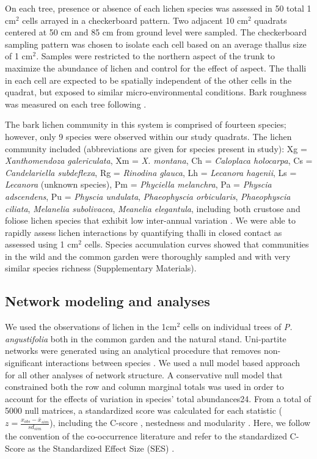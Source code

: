 \documentclass[fleqn,10pt]{wlscirep}
\begin{document}
On each tree, presence or absence of each lichen species was assessed
in 50 total 1 cm$^2$ cells arrayed in a checkerboard pattern. Two
adjacent 10 cm$^2$ quadrats centered at 50 cm and 85 cm from ground
level were sampled. The checkerboard sampling pattern was chosen to
isolate each cell based on an average thallus size of 1
cm$^2$. Samples were restricted to the northern aspect of the trunk to
maximize the abundance of lichen and control for the effect of
aspect. The thalli in each cell are expected to be spatially
independent of the other cells in the quadrat, but exposed to similar
micro-environmental conditions. Bark roughness was measured on each
tree following \cite{Winfree2011}.

The bark lichen community in this system is comprised of fourteen
species; however, only 9 species were observed within our study
quadrats. The lichen community included (abbreviations are given for
species present in study): Xg = \textit{Xanthomendoza galericulata},
Xm = \textit{X. montana}, Ch = \textit{Caloplaca holocarpa}, Cs =
\textit{Candelariella subdeflexa}, Rg = \textit{Rinodina glauca}, Lh =
\textit{Lecanora hagenii}, Ls = \textit{Lecanora} (unknown species),
Pm = \textit{Phyciella melanchra}, Pa = \textit{Physcia adscendens},
Pu = \textit{Physcia undulata}, \textit{Phaeophyscia orbicularis},
\textit{Phaeophyscia ciliata}, \textit{Melanelia subolivacea},
\textit{Meanelia elegantula}, including both crustose and foliose
lichen species that exhibit low inter-annual variation
\cite{Lamit2011}. We were able to rapidly assess lichen interactions
by quantifying thalli in closed contact as assessed using 1 cm$^2$
cells. Species accumulation curves showed that communities in the wild
and the common garden were thoroughly sampled and with very similar
species richness (Supplementary Materials).


\subsection*{Network modeling and analyses}

We used the observations of lichen in the 1cm$^2$ cells on individual
trees of \textit{P. angustifolia} both in the common garden and the
natural stand. Uni-partite networks were generated using an analytical
procedure that removes non-significant interactions between species
\cite{Araujo2011}. We used a null model based approach for all other
analyses of network structure. A conservative null model that
constrained both the row and column marginal totals was used in order
to account for the effects of variation in species’ total
abundances24. From a total of 5000 null matrices, a standardized score
was calculated for each statistic ($z = \frac{x_{obs} -
  \bar{x}_{sim}}{sd_{sim}}$), including the C-score \cite{Stone1990a},
nestedness \cite{Atmar1993} and modularity \cite{Newman2006}. Here, we
follow the convention of the co-occurrence literature and refer to the
standardized C-Score as the Standardized Effect Size (SES)
\cite{Gotelli2001}.
\end{document}
